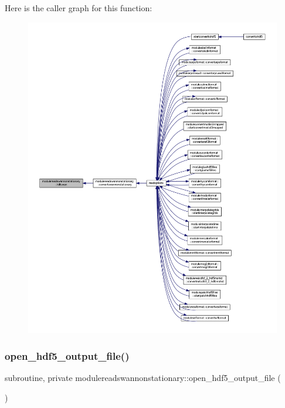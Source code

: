 Here is the caller graph for this function\+:\nopagebreak
\begin{figure}[H]
\begin{center}
\leavevmode
\includegraphics[width=350pt]{namespacemodulereadswannonstationary_a568ac2906250752e8eb67fb713cc4212_icgraph}
\end{center}
\end{figure}
\mbox{\label{namespacemodulereadswannonstationary_adfb4e0c4deb8bcba31fe72f185128ace}} 
\subsubsection{\texorpdfstring{open\+\_\+hdf5\+\_\+output\+\_\+file()}{open\_hdf5\_output\_file()}}
{\footnotesize\ttfamily subroutine, private modulereadswannonstationary\+::open\+\_\+hdf5\+\_\+output\+\_\+file (\begin{DoxyParamCaption}{ }\end{DoxyParamCaption})\hspace{0.3cm}{\ttfamily [private]}}

